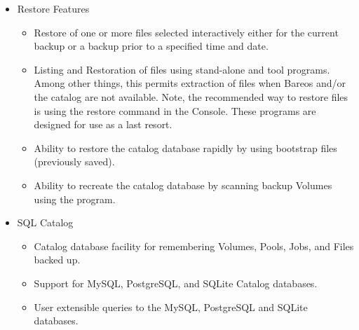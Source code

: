 \begin{itemize}
\item Restore Features
   \begin{itemize}
   \item Restore of one or more files selected interactively either for the
      current backup or a backup prior to a specified time and date.
   \item Listing and Restoration of files using stand-alone  and 
      tool programs. Among other things, this permits extraction of
      files when Bareos and/or the catalog are not available. Note, the
      recommended way to restore files is using the restore command in the
      Console. These programs are designed for use as a last resort.
   \item Ability to restore the catalog database rapidly by using bootstrap
      files (previously saved).
   \item Ability to recreate the catalog database by scanning backup Volumes
      using the  program.
   \end{itemize}

\item SQL Catalog
   \begin{itemize}
   \item Catalog database facility for remembering Volumes, Pools, Jobs,  and
      Files backed up.
   \item Support for MySQL, PostgreSQL, and SQLite Catalog databases.
   \item User extensible queries to the MySQL, PostgreSQL and SQLite databases.
   \end{itemize}


\end{itemize}
